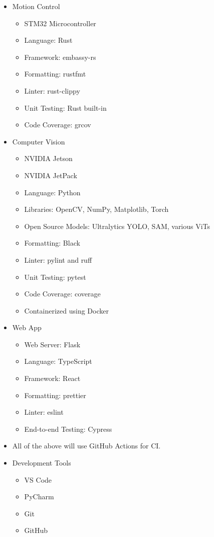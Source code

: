 \documentclass{article}
\begin{document}
\begin{itemize}
  \item Motion Control
        \begin{itemize}
          \item STM32 Microcontroller
          \item Language: Rust
          \item Framework: embassy-rs
          \item Formatting: rustfmt
          \item Linter: rust-clippy
          \item Unit Testing: Rust built-in
          \item Code Coverage: grcov
        \end{itemize}
  \item Computer Vision
        \begin{itemize}
          \item NVIDIA Jetson
          \item NVIDIA JetPack
          \item Language: Python
          \item Libraries: OpenCV, NumPy, Matplotlib, Torch
          \item Open Source Models: Ultralytics YOLO, SAM, various ViTs
          \item Formatting: Black
          \item Linter: pylint and ruff
          \item Unit Testing: pytest
          \item Code Coverage: coverage
          \item Containerized using Docker
        \end{itemize}
  \item Web App
        \begin{itemize}
          \item Web Server: Flask
          \item Language: TypeScript
          \item Framework: React
          \item Formatting: prettier
          \item Linter: eslint
          \item End-to-end Testing: Cypress
        \end{itemize}
  \item All of the above will use GitHub Actions for CI.
  \item Development Tools
        \begin{itemize}
          \item VS Code
          \item PyCharm
          \item Git
          \item GitHub
        \end{itemize}
\end{itemize}
\end{document}
